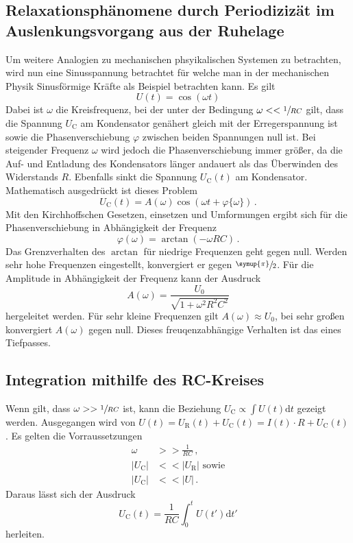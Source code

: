 \subsection{Relaxationsphänomene durch Periodizizät im Auslenkungsvorgang 
aus der Ruhelage}
Um weitere Analogien zu mechanischen phsyikalischen Systemen zu betrachten,
wird nun eine Sinusspannung betrachtet für welche man in der mechanischen 
Physik Sinusförmige Kräfte als Beispiel betrachten kann. Es gilt
\begin{equation}
    U(t)=\cos(\omega t)
\end{equation}
Dabei ist $\omega$ die Kreisfrequenz, bei der unter der Bedingung $\omega<<\sfrac{1}{RC}$
gilt, dass die Spannung $U_\text{C}$ am Kondensator genähert gleich mit der Erregerspannung ist
sowie die Phasenverschiebung $\varphi$ zwischen beiden Spannungen null ist.
Bei steigender Frequenz $\omega$ wird jedoch die Phasenverschiebung immer größer,
da die Auf- und Entladung des Kondensators länger andauert als das Überwinden des
Widerstands $R$. Ebenfalls sinkt die Spannung $U_\text{C}(t)$ am Kondensator.
Mathematisch ausgedrückt ist dieses Problem 
\begin{equation}
    U_\text{C}(t)=A(\omega)\cos(\omega t+\varphi\{\omega\})\,.
\end{equation}
Mit den Kirchhoffschen Gesetzen, einsetzen und Umformungen ergibt sich für die Phasenverschiebung
in Abhängigkeit der Frequenz
\begin{equation}
    \varphi(\omega)=\arctan(-\omega RC)\,.
\end{equation}
Das Grenzverhalten des $\arctan$ für niedrige Frequenzen geht gegen null.
Werden sehr hohe Frequenzen eingestellt, konvergiert er gegen $\sfrac{\symup{\pi}}{2}$.
Für die Amplitude in Abhängigkeit der Frequenz kann der Ausdruck
\begin{equation}
    A(\omega)=\frac{U_0}{\sqrt{1+\omega^2R^2C^2}}
\end{equation}
hergeleitet werden. Für sehr kleine Frequenzen gilt $A(\omega)\approx U_0$, bei sehr großen
konvergiert $A(\omega)$ gegen null. Dieses freuqenzabhängige Verhalten ist das eines
Tiefpasses.
\subsection{Integration mithilfe des RC-Kreises}
Wenn gilt, dass $\omega >>\sfrac{1}{RC}$ ist, kann die Beziehung
$U_\text{C}\propto\int U(t)\text{d}t$ gezeigt werden. Ausgegangen wird von
$U(t)=U_\text{R}(t)+U_\text{C}(t)=I(t)\cdot R+U_\text{C}(t)$.
Es gelten die Vorraussetzungen
\begin{align}
    \omega &>>\frac{1}{RC}\,,\\
    |U_\text{C}|&<<|U_\text{R}|\text{ sowie}\\
    |U_\text{C}|&<<|U|\,.
\end{align}
Daraus lässt sich der Ausdruck
\begin{equation}
    U_\text{C}(t)=\frac{1}{RC}\int_0^t U(t')\text{d}t'
\end{equation}
herleiten.
